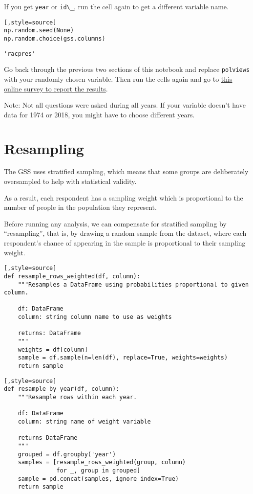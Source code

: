 If you get \passthrough{\lstinline!year!} or
\passthrough{\lstinline!id\_!}, run the cell again to get a different
variable name.

\begin{lstlisting}[,style=source]
np.random.seed(None)
np.random.choice(gss.columns)
\end{lstlisting}

\begin{lstlisting}[style=output]
'racpres'
\end{lstlisting}

Go back through the previous two sections of this notebook and replace
\passthrough{\lstinline!polviews!} with your randomly chosen variable.
Then run the cells again and go to
\href{https://forms.gle/tmST8YCu4qLc414F7}{this online survey to report
the results}.

Note: Not all questions were asked during all years. If your variable
doesn't have data for 1974 or 2018, you might have to choose different
years.

\hypertarget{resampling}{%
\section{Resampling}\label{resampling}}

The GSS uses stratified sampling, which means that some groups are
deliberately oversampled to help with statistical validity.

As a result, each respondent has a sampling weight which is proportional
to the number of people in the population they represent.

Before running any analysis, we can compensate for stratified sampling
by ``resampling'', that is, by drawing a random sample from the dataset,
where each respondent's chance of appearing in the sample is
proportional to their sampling weight.

\begin{lstlisting}[,style=source]
def resample_rows_weighted(df, column):
    """Resamples a DataFrame using probabilities proportional to given column.

    df: DataFrame
    column: string column name to use as weights

    returns: DataFrame
    """
    weights = df[column]
    sample = df.sample(n=len(df), replace=True, weights=weights)
    return sample
\end{lstlisting}

\begin{lstlisting}[,style=source]
def resample_by_year(df, column):
    """Resample rows within each year.

    df: DataFrame
    column: string name of weight variable

    returns DataFrame
    """
    grouped = df.groupby('year')
    samples = [resample_rows_weighted(group, column)
               for _, group in grouped]
    sample = pd.concat(samples, ignore_index=True)
    return sample
\end{lstlisting}


